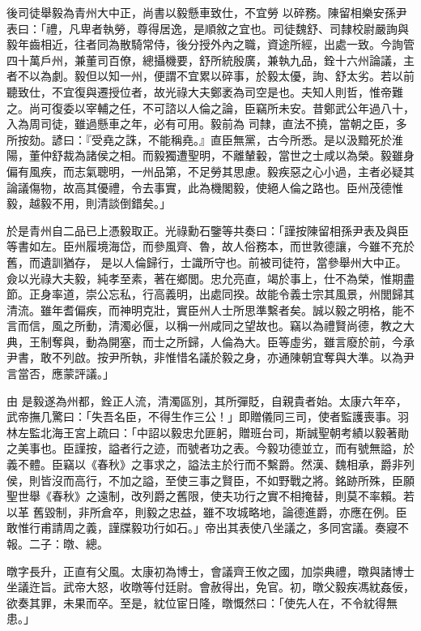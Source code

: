 \begin{pinyinscope}
 後司徒舉毅為青州大中正，尚書以毅懸車致仕，不宜勞
 以碎務。陳留相樂安孫尹表曰：「禮，凡卑者執勞，尊得居逸，是順敘之宜也。司徒魏舒、司隸校尉嚴詢與毅年齒相近，往者同為散騎常侍，後分授外內之職，資途所經，出處一致。今詢管四十萬戶州，兼董司百僚，總攝機要，舒所統殷廣，兼執九品，銓十六州論議，主者不以為劇。毅但以知一州，便謂不宜累以碎事，於毅太優，詢、舒太劣。若以前聽致仕，不宜復與遷授位者，故光祿大夫鄭袤為司空是也。夫知人則哲，惟帝難之。尚可復委以宰輔之任，不可諮以人倫之論，臣竊所未安。昔鄭武公年過八十，入為周司徒，雖過懸車之年，必有可用。毅前為
 司隸，直法不撓，當朝之臣，多所按劾。諺曰：『受堯之誅，不能稱堯。』直臣無黨，古今所悉。是以汲黯死於淮陽，董仲舒裁為諸侯之相。而毅獨遭聖明，不離輦轂，當世之士咸以為榮。毅雖身偏有風疾，而志氣聰明，一州品第，不足勞其思慮。毅疾惡之心小過，主者必疑其論議傷物，故高其優禮，令去事實，此為機閣毅，使絕人倫之路也。臣州茂德惟毅，越毅不用，則清談倒錯矣。」



 於是青州自二品已上憑毅取正。光祿勳石鑒等共奏曰：「謹按陳留相孫尹表及與臣等書如左。臣州履境海岱，而參風齊、魯，故人俗務本，而世敦德讓，今雖不充於舊，而遺訓猶存，
 是以人倫歸行，士識所守也。前被司徒符，當參舉州大中正。僉以光祿大夫毅，純孝至素，著在鄉閭。忠允亮直，竭於事上，仕不為榮，惟期盡節。正身率道，崇公忘私，行高義明，出處同揆。故能令義士宗其風景，州閭歸其清流。雖年耆偏疾，而神明克壯，實臣州人士所思準繫者矣。誠以毅之明格，能不言而信，風之所動，清濁必偃，以稱一州咸同之望故也。竊以為禮賢尚德，教之大典，王制奪與，動為開塞，而士之所歸，人倫為大。臣等虛劣，雖言廢於前，今承尹書，敢不列啟。按尹所執，非惟惜名議於毅之身，亦通陳朝宜奪與大準。以為尹言當否，應蒙評議。」



 由
 是毅遂為州都，銓正人流，清濁區別，其所彈貶，自親貴者始。太康六年卒，武帝撫几驚曰：「失吾名臣，不得生作三公！」即贈儀同三司，使者監護喪事。羽林左監北海王宮上疏曰：「中詔以毅忠允匪躬，贈班台司，斯誠聖朝考績以毅著勛之美事也。臣謹按，謚者行之迹，而號者功之表。今毅功德並立，而有號無謚，於義不體。臣竊以《春秋》之事求之，謚法主於行而不繫爵。然漢、魏相承，爵非列侯，則皆沒而高行，不加之謚，至使三事之賢臣，不如野戰之將。銘跡所殊，臣願聖世舉《春秋》之遠制，改列爵之舊限，使夫功行之實不相掩替，則莫不率賴。若以革
 舊毀制，非所倉卒，則毅之忠益，雖不攻城略地，論德進爵，亦應在例。臣敢惟行甫請周之義，謹牒毅功行如石。」帝出其表使八坐議之，多同宮議。奏寢不報。二子：暾、總。



 暾字長升，正直有父風。太康初為博士，會議齊王攸之國，加崇典禮，暾與諸博士坐議迕旨。武帝大怒，收暾等付廷尉。會赦得出，免官。初，暾父毅疾馮紞姦佞，欲奏其罪，未果而卒。至是，紞位宦日隆，暾慨然曰：「使先人在，不令紞得無患。」




\end{pinyinscope}

